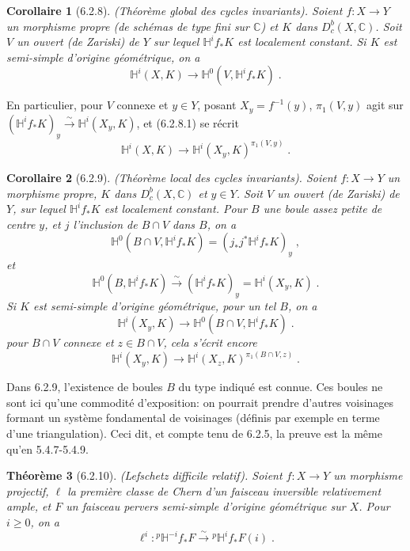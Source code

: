 \documentclass[12pt,a4paper]{article}
\theoremstyle{plain}
\newtheorem{theorem}{Th\'eor\`eme}[section]
\newtheorem{corollary}[theorem]{Corollaire}
\theoremstyle{definition}
\theoremstyle{remark}
\newcommand{\CC}{\mathbb{C}}
\newcommand{\HH}{\mathbb{H}}
\begin{document}
\begin{corollary}[6.2.8]\label{cor:6.2.8}(Th\'eor\`eme global des cycles invariants).
Soient $f: X \to Y$ un morphisme propre (de sch\'emas de type fini sur $\CC$) et $K$ dans $D^b_c(X, \CC)$. Soit $V$ un ouvert (de Zariski) de $Y$ sur lequel $\HH^if_*K$ est localement constant. Si $K$ est semi-simple d'origine g\'eom\'etrique, on a
\begin{equation}\label{eq:6.2.8.1}
\HH^i(X, K) \longrightarrow \HH^0(V, \HH^if_*K)\;.
\end{equation}
\end{corollary}

En particulier, pour $V$ connexe et $y \in Y$, posant $X_y = f^{-1}(y)$, $\pi_1(V, y)$ agit sur $(\HH^if_*K)_y \xrightarrow{\sim} \HH^i(X_y, K)$, et (6.2.8.1) se r\'ecrit
\begin{equation}\label{eq:6.2.8.2}
\HH^i(X, K) \longrightarrow \HH^i(X_y, K)^{\pi_1(V, y)}\;.
\end{equation}

\begin{corollary}[6.2.9]\label{cor:6.2.9}(Th\'eor\`eme local des cycles invariants).
Soient $f: X \to Y$ un morphisme propre, $K$ dans $D^b_c(X, \CC)$ et $y \in Y$. Soit $V$ un ouvert (de Zariski) de $Y$, sur lequel $\HH^if_*K$ est localement constant. Pour $B$ une boule assez petite de centre $y$, et $j$ l'inclusion de $B \cap V$ dans $B$, on a
\[
\HH^0(B \cap V, \HH^if_*K) = (j_*j^*\HH^if_*K)_y\;,
\]
et
\[
\HH^0(B, \HH^if_*K) \xrightarrow{\sim} (\HH^if_*K)_y = \HH^i(X_y, K)\;.
\]
Si $K$ est semi-simple d'origine g\'eom\'etrique, pour un tel $B$, on a
\begin{equation}\label{eq:6.2.9.1}
\HH^i(X_y, K) \longrightarrow \HH^0(B \cap V, \HH^if_*K)\;.
\end{equation}
pour $B \cap V$ connexe et $z \in B \cap V$, cela s'\'ecrit encore
\begin{equation}\label{eq:6.2.9.2}
\HH^i(X_y, K) \longrightarrow \HH^i(X_z, K)^{\pi_1(B \cap V, z)}\;.
\end{equation}
\end{corollary}

Dans 6.2.9, l'existence de boules $B$ du type indiqu\'e est connue. Ces boules ne sont ici qu'une commodit\'e d'exposition: on pourrait prendre d'autres voisinages formant un syst\`eme fondamental de voisinages (d\'efinis par exemple en terme d'une triangulation). Ceci dit, et compte tenu de 6.2.5, la preuve est la m\^eme qu'en 5.4.7-5.4.9.

\begin{theorem}[6.2.10]\label{thm:6.2.10}(Lefschetz difficile relatif).
Soient $f: X \to Y$ un morphisme projectif, $\ell$ la premi\`ere classe de Chern d'un faisceau inversible relativement ample, et $F$ un faisceau pervers semi-simple d'origine g\'eom\'etrique sur $X$. Pour $i \geq 0$, on a
\[
\ell^i: {}^{p}\HH^{-i}f_*F \xrightarrow{\sim} {}^{p}\HH^if_*F(i)\;.
\]
\end{theorem}
\end{document}
